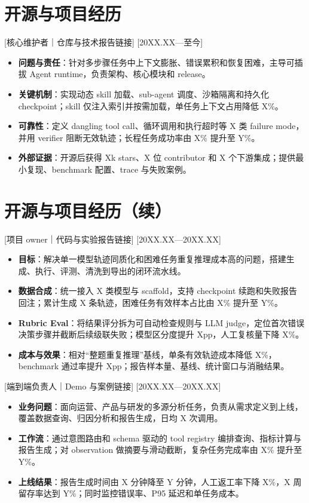 \documentclass{resume-photo}
\begin{document}
\section{开源与项目经历}
[\textnormal{核心维护者｜仓库与技术报告链接}]
[20XX.XX—至今]
\begin{itemize}
  \item \textbf{问题与责任}：针对多步骤任务中上下文膨胀、错误累积和恢复困难，主导可插拔 Agent runtime，负责架构、核心模块和 release。
  \item \textbf{关键机制}：实现动态 skill 加载、sub-agent 调度、沙箱隔离和持久化 checkpoint；skill 仅注入索引并按需加载，单任务上下文占用降低 X\%。
  \item \textbf{可靠性}：定义 dangling tool call、循环调用和执行超时等 X 类 failure mode，并用 verifier 阻断无效轨迹；长程任务成功率由 X\% 提升至 Y\%。
  \item \textbf{外部证据}：开源后获得 Xk stars、X 位 contributor 和 X 个下游集成；提供最小复现、benchmark 配置、trace 与失败案例。
\end{itemize}

\pagebreak

\section{开源与项目经历（续）}
[\textnormal{项目 owner｜代码与实验报告链接}]
[20XX.XX—20XX.XX]
\begin{itemize}
  \item \textbf{目标}：解决单一模型轨迹同质化和困难任务重复推理成本高的问题，搭建生成、执行、评测、清洗到导出的闭环流水线。
  \item \textbf{数据合成}：统一接入 X 类模型与 scaffold，支持 checkpoint 续跑和失败报告回注；累计生成 X 条轨迹，困难任务有效样本占比由 X\% 提升至 Y\%。
  \item \textbf{Rubric Eval}：将结果评分拆为可自动检查规则与 LLM judge，定位首次错误决策步骤并截断后续级联失败；模型区分度提升 Xpp，人工复核量下降 X\%。
  \item \textbf{成本与效果}：相对“整题重复推理”基线，单条有效轨迹成本降低 X\%，benchmark 通过率提升 Xpp；报告样本量、基线、统计窗口与消融结果。
\end{itemize}

[\textnormal{端到端负责人｜Demo 与案例链接}]
[20XX.XX—20XX.XX]
\begin{itemize}
  \item \textbf{业务问题}：面向运营、产品与研发的多源分析任务，负责从需求定义到上线，覆盖数据查询、归因分析和报告生成，日均 X 次调用。
  \item \textbf{工作流}：通过意图路由和 schema 驱动的 tool registry 编排查询、指标计算与报告生成；对 observation 做摘要与滑动截断，复杂任务完成率由 X\% 提升至 Y\%。
  \item \textbf{上线结果}：报告生成时间由 X 分钟降至 Y 分钟，人工返工率下降 X\%，X 周留存率达到 Y\%；同时监控错误率、P95 延迟和单任务成本。
\end{itemize}
\end{document}

